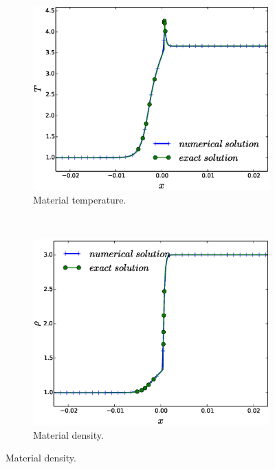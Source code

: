 \documentclass[times,doublespace]{fldauth}%
\begin{document}
\begin{figure}[h]
    \begin{subfigure}{0.32\textwidth}
    \centering
    \includegraphics[width=\linewidth]{figures/cst-xs/mach-3/mass-diff-mat-temp-nel-1000-plot.eps}
    \caption{Material temperature.}\label{fig:mach-3-cst-xs-temp}
    \end{subfigure}	
    ~
    \begin{subfigure}{0.32\textwidth}
    \centering
    \includegraphics[width=\linewidth]{figures/cst-xs/mach-3/mass-diff-density-nel-1000-plot.eps}
    \caption{Material density.}\label{fig:mach-3-cst-xs-dens}
    \end{subfigure}

\end{figure}
\end{document}
